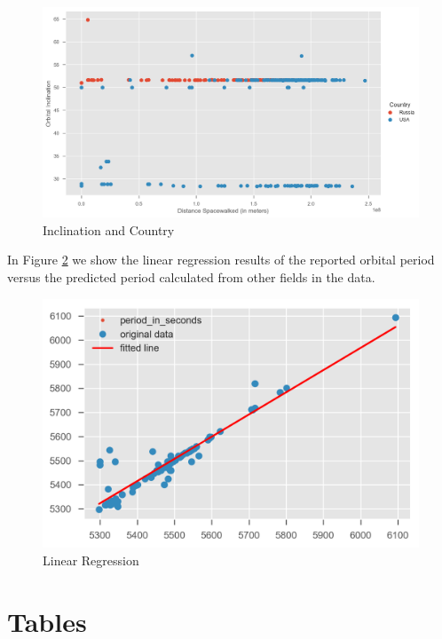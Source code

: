 \documentclass[sigconf]{acmart}
\begin{document}
\begin{figure}[!ht]
	\centering\includegraphics[width=\columnwidth]{images/fig3.png}
	\caption{Inclination and Country}\label{f:fig3}
\end{figure}


In Figure \ref{f:fig4} we show the linear regression results of the reported orbital period versus the predicted period calculated from other fields in the data. 

\begin{figure}[!ht]
	\centering\includegraphics[width=\columnwidth]{images/fig4.png}
	\caption{Linear Regression}\label{f:fig4}
\end{figure}



\section{Tables}
\end{document}

